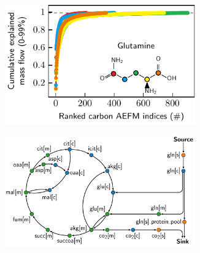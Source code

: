 \documentclass[varwidth]{standalone}
\begin{document}
\vspace*{-2ex}
\begin{figure}
    \begin{subfigure}[t]{0.495\textwidth}
        \caption{}
        \centering
        \includegraphics[width=0.9\textwidth]{subpanel-a/cumulative-source-met-14.pdf}
    \end{subfigure}
    \begin{subfigure}[t]{0.495\textwidth}
        \caption{}
        \includegraphics[width=0.9\textwidth]{subpanel-b/network-top-5-only.pdf}
    \end{subfigure}
    \begin{subfigure}[t]{0.495\textwidth}
        \vspace*{-2ex}
        \caption{}
        \centering

\end{subfigure}
\end{figure}
\end{document}
